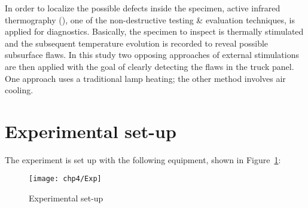 
In order to localize the possible defects inside the specimen, active infrared thermography (\citet{Maldague2001theory,Balageas2016}), one of the non-destructive testing \& evaluation techniques, is applied for diagnostics. Basically, the specimen to inspect is thermally stimulated and the subsequent temperature evolution is recorded to reveal possible subsurface ﬂaws. In this study two opposing approaches of external stimulations are then applied with the goal of clearly detecting the flaws in the truck panel. One approach uses a traditional lamp heating; the other method involves air cooling. 


\section{Experimental set-up}
The experiment is set up with the following equipment, shown in Figure~\ref{Exp}:
\begin{figure}
    \centering
    \texttt{[image: chp4/Exp]}
    \caption{Experimental set-up}
    \label{Exp}
\end{figure}

